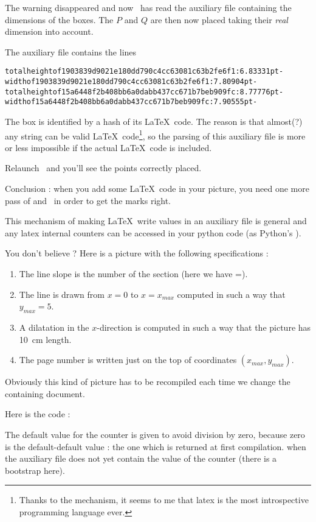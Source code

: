 The warning disappeared and now \phystricks\ has read the auxiliary file containing the dimensions of the boxes. The \( P\) and \( Q\) are then now placed taking their \emph{real} dimension into account.

The auxiliary file contains the lines
\begin{verbatim}
totalheightof1903839d9021e180dd790c4cc63081c63b2fe6f1:6.83331pt-
widthof1903839d9021e180dd790c4cc63081c63b2fe6f1:7.80904pt-
totalheightof15a6448f2b408bb6a0dabb437cc671b7beb909fc:8.77776pt-
widthof15a6448f2b408bb6a0dabb437cc671b7beb909fc:7.90555pt-
\end{verbatim}

The box is identified by a hash of its \LaTeX\ code. The reason is that almost(?) any string can be valid \LaTeX\ code\footnote{Thanks to the  mechanism, it seems to me that latex is the most introspective programming language ever.}, so the parsing of this auxiliary file is more or less impossible if the actual \LaTeX\ code is included.

Relaunch \pdfLaTeX\ and you'll see the points correctly placed.

Conclusion : when you add some \LaTeX\ code in your picture, you need one more pass of \pdfLaTeX and \phystricks\ in order to get the marks right.

This mechanism of making \LaTeX\ write values in an auxiliary file is general and any latex internal counters can be accessed in your python code (as Python's ).

You don't believe ? Here is a picture with the following specifications :
\begin{enumerate}
    \item
        The line slope is the number of the section (here we have \info{\thesection}=\thesection).
\item
The line is drawn from \( x=0\) to \( x=x_{max}\) computed in such a way that \( y_{max}=5\). 
\item
A dilatation in the \( x\)-direction is computed in such a way that the picture has \SI{10}{\centi\meter} length.
\item
    The page number is written just on the top of coordinates \( (x_{max},y_{max})\).
\end{enumerate}

\begin{center}
   
\end{center}

Obviously this kind of picture has to be recompiled each time we change the containing document.

Here is the code :



The default value for the  counter is given to avoid division by zero, because zero is the default-default value : the one which is returned at first compilation. when the auxiliary file does not yet contain the value of the counter (there is a bootstrap here).
